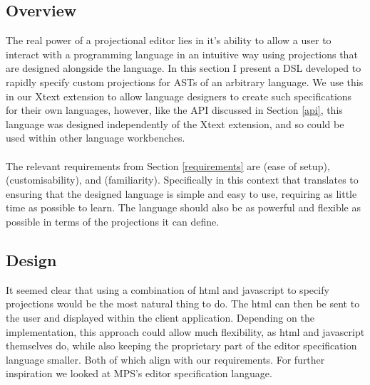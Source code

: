 \documentclass{article}
\begin{document}
\subsection{Overview}
The real power of a projectional editor lies in it's ability to allow a user to interact with a programming language in an intuitive way using projections that are designed alongside the language. In this section I present a DSL developed to rapidly specify custom projections for ASTs of an arbitrary language. We use this in our Xtext extension to allow language designers to create such specifications for their own languages, however, like the API discussed in Section \ref{api}, this language was designed independently of the Xtext extension, and so could be used within other language workbenches.
\\
\\
The relevant requirements from Section \ref{requirements} are \RSetup (ease of setup), \RCustom (customisability), and \RFamiliarity (familiarity). Specifically in this context that translates to ensuring that the designed language is simple and easy to use, requiring as little time as possible to learn. The language should also be as powerful and flexible as possible in terms of the projections it can define.

\subsection{Design}

It seemed clear that using a combination of html and javascript to specify projections would be the most natural thing to do. The html can then be sent to the user and displayed within the client application. Depending on the implementation, this approach could allow much flexibility, as html and javascript themselves do, while also keeping the proprietary part of the editor specification language smaller. Both of which align with our requirements. For further inspiration we looked at MPS's editor specification language.
\end{document}
